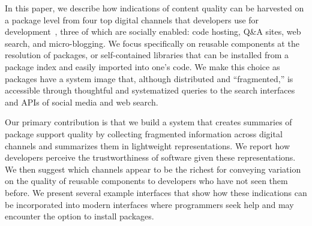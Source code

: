 In this paper, we describe how indications of content quality can be harvested on a package level from four top digital channels that developers use for development~\cite{storey_revolution_2014}, three of which are socially enabled: code hosting, Q\&A sites, web search, and micro-blogging.
We focus specifically on reusable components at the resolution of packages, or self-contained libraries that can be installed from a package index and easily imported into one's code.
We make this choice as packages have a system image that, although distributed and ``fragmented,'' is accessible through thoughtful and systematized queries to the search interfaces and APIs of social media and web search.

Our primary contribution is that we build a system that creates summaries of package support quality by collecting fragmented information across digital channels and summarizes them in lightweight representations.
We report how developers perceive the trustworthiness of software given these representations.
We then suggest which channels appear to be the richest for conveying variation on the quality of reusable components to developers who have not seen them before.
We present several example interfaces that show how these indications can be incorporated into modern interfaces where programmers seek help and may encounter the option to install packages.
\fi
